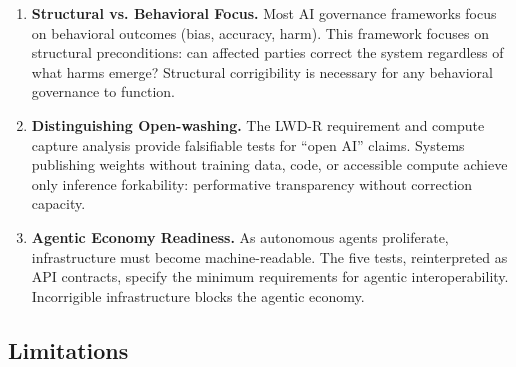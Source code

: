 \documentclass{article}
\theoremstyle{definition}
\begin{document}
\begin{enumerate}
    \item \textbf{Structural vs. Behavioral Focus.} Most AI governance frameworks focus on behavioral outcomes (bias, accuracy, harm). This framework focuses on structural preconditions: can affected parties correct the system regardless of what harms emerge? Structural corrigibility is necessary for any behavioral governance to function.

    \item \textbf{Distinguishing Open-washing.} The LWD-R requirement and compute capture analysis provide falsifiable tests for ``open AI'' claims. Systems publishing weights without training data, code, or accessible compute achieve only inference forkability: performative transparency without correction capacity.

    \item \textbf{Agentic Economy Readiness.} As autonomous agents proliferate, infrastructure must become machine-readable. The five tests, reinterpreted as API contracts, specify the minimum requirements for agentic interoperability. Incorrigible infrastructure blocks the agentic economy.
\end{enumerate}

\subsection{Limitations}
\end{document}
